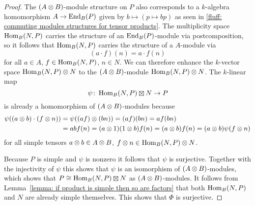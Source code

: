 \begin{proof}
  The $(A \mathbin{\otimes} B)$-module structure on $P$ also corresponds to a $k$-algebra homomorphism $A \to \operatorname{End}_B(P)$ given by $b \mapsto (p \mapsto bp)$ as seen in \ref{fluff: commuting modules structures for tensor products}. 
  The multiplicity space $\operatorname{Hom}_B(N,P)$ carries the structure of an $\operatorname{End}_B(P)$-module via postcomposition, so it follows that $\operatorname{Hom}_B(N,P)$ carries the structure of a $A$-module via
  \[
      (a \cdot f)(n)
    = a \cdot f(n)
  \]
  for all $a \in A$, $f \in \operatorname{Hom}_B(N,P)$, $n \in N$.
  We can therefore enhance the $k$-vector space $\operatorname{Hom}_B(N,P) \mathbin{\otimes} N$ to the $(A \mathbin{\otimes} B)$-module $\operatorname{Hom}_B(N,P) \mathbin{\otimes} N$.
  The $k$-linear map
  \[
            \psi
    \colon  \Hom_B(N,P) \outertensor N
    \to     P
  \]
  is already a homomorphism of $(A \mathbin{\otimes} B)$-modules because
  \begin{align*}
        \psi((a \mathbin{\otimes} b) \cdot (f \mathbin{\otimes} n))
    &=  \psi((af) \mathbin{\otimes} (bn))
     =  (af)(bn)
     =  a f(bn) \\
    &=  a b f(n)
     =  (a \mathbin{\otimes} 1)(1 \mathbin{\otimes} b) f(n)
     =  (a \mathbin{\otimes} b) f(n)
     =  (a \mathbin{\otimes} b) \psi(f \mathbin{\otimes} n)
  \end{align*}
  for all simple tensors $a \mathbin{\otimes} b \in A \mathbin{\otimes} B$, $f \mathbin{\otimes} n \in \operatorname{Hom}_B(N,P) \mathbin{\otimes} N$.
  
  Because $P$ is simple and $\psi$ is nonzero it follows that $\psi$ is surjective.
  Together with the injectivity of $\psi$ this shows that $\psi$ is an isomorphism of $(A \mathbin{\otimes} B)$-modules, which shows that $P \cong \Hom_B(N,P) \outertensor N$ as $(A \mathbin{\otimes} B)$-modules.
  It follows from Lemma~\ref{lemma: if product is simple then so are factors} that both $\operatorname{Hom}_B(N,P)$ and $N$ are already simple themselves.
  This shows that $\Phi$ is surjective.
\end{proof}




